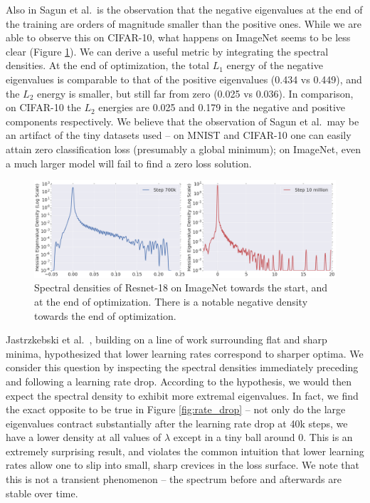 \documentclass{article}
\begin{document}
Also in Sagun et al.\ is the observation that the negative eigenvalues at the end of the training are orders of magnitude smaller than the positive ones. While we are able to observe this on CIFAR-10, what
happens on ImageNet seems to be less clear (Figure \ref{fig:image_net_negatives}). We can derive a useful metric by integrating the spectral densities. At the end of optimization, the total $L_1$ energy of the negative eigenvalues is comparable to that of the positive eigenvalues (0.434 vs 0.449), and the $L_2$ energy is smaller, but still far from zero (0.025 vs 0.036). In comparison, on CIFAR-10 the $L_2$ energies are 0.025 and 0.179 in the negative and positive components respectively. We believe that the observation of Sagun et al.\ may be an artifact of the tiny datasets used -- on MNIST and CIFAR-10 one can easily attain zero classification loss (presumably a global minimum); on ImageNet, even a much larger model will fail to find a zero loss solution.
\begin{figure}[ht]
\includegraphics[width=\textwidth]{700k_vs_10m.png}
\vspace{-0.5cm}
\caption{Spectral densities of Resnet-18 on ImageNet towards the start, and at the end of optimization. There is a notable negative density towards the end of optimization.
 \label{fig:image_net_negatives}}
\end{figure}

Jastrzkebski et al.\ \cite{jastrzkebski2017three}, building on a line of work surrounding flat and sharp minima, hypothesized that lower learning rates correspond to sharper optima. We consider this question by inspecting the spectral densities immediately preceding and following a learning rate drop. According to the hypothesis, we would then expect the spectral density to exhibit more extremal eigenvalues. In fact, we find the exact opposite to be true in Figure \ref{fig:rate_drop} -- not only do the large eigenvalues contract substantially after the learning rate drop at 40k steps, we have a lower density at all values of $\lambda$ except in a tiny ball around 0. This is an extremely surprising result, and violates the common intuition that lower learning rates allow one to slip into small, sharp crevices in the loss surface. We note that this is not a transient phenomenon -- the spectrum before and afterwards are stable over time.
\end{document}
